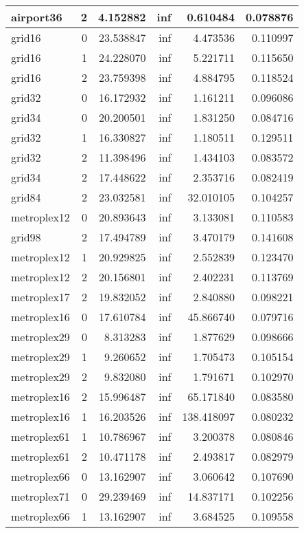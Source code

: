\documentclass[../../../thesis.tex]{subfiles}
\begin{document}
\begin{longtable}{|l|r|r|r|r|r|}
\endfoot
\endlastfoot
airport36 & 2 & 4.152882 & inf & 0.610484 & 0.078876 \\\hline
grid16 & 0 & 23.538847 & inf & 4.473536 & 0.110997 \\\hline
grid16 & 1 & 24.228070 & inf & 5.221711 & 0.115650 \\\hline
grid16 & 2 & 23.759398 & inf & 4.884795 & 0.118524 \\\hline
grid32 & 0 & 16.172932 & inf & 1.161211 & 0.096086 \\\hline
grid34 & 0 & 20.200501 & inf & 1.831250 & 0.084716 \\\hline
grid32 & 1 & 16.330827 & inf & 1.180511 & 0.129511 \\\hline
grid32 & 2 & 11.398496 & inf & 1.434103 & 0.083572 \\\hline
grid34 & 2 & 17.448622 & inf & 2.353716 & 0.082419 \\\hline
grid84 & 2 & 23.032581 & inf & 32.010105 & 0.104257 \\\hline
metroplex12 & 0 & 20.893643 & inf & 3.133081 & 0.110583 \\\hline
grid98 & 2 & 17.494789 & inf & 3.470179 & 0.141608 \\\hline
metroplex12 & 1 & 20.929825 & inf & 2.552839 & 0.123470 \\\hline
metroplex12 & 2 & 20.156801 & inf & 2.402231 & 0.113769 \\\hline
metroplex17 & 2 & 19.832052 & inf & 2.840880 & 0.098221 \\\hline
metroplex16 & 0 & 17.610784 & inf & 45.866740 & 0.079716 \\\hline
metroplex29 & 0 & 8.313283 & inf & 1.877629 & 0.098666 \\\hline
metroplex29 & 1 & 9.260652 & inf & 1.705473 & 0.105154 \\\hline
metroplex29 & 2 & 9.832080 & inf & 1.791671 & 0.102970 \\\hline
metroplex16 & 2 & 15.996487 & inf & 65.171840 & 0.083580 \\\hline
metroplex16 & 1 & 16.203526 & inf & 138.418097 & 0.080232 \\\hline
metroplex61 & 1 & 10.786967 & inf & 3.200378 & 0.080846 \\\hline
metroplex61 & 2 & 10.471178 & inf & 2.493817 & 0.082979 \\\hline
metroplex66 & 0 & 13.162907 & inf & 3.060642 & 0.107690 \\\hline
metroplex71 & 0 & 29.239469 & inf & 14.837171 & 0.102256 \\\hline
metroplex66 & 1 & 13.162907 & inf & 3.684525 & 0.109558 \\\hline

\end{longtable}
\end{document}
